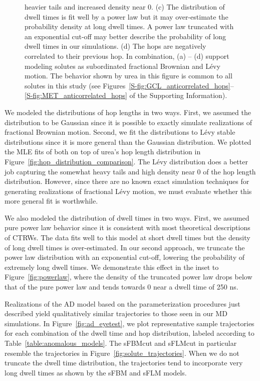 \documentclass[12pt]{article}
\begin{document}
\begin{figure}
{  heavier tails and increased density near 0. (c) The distribution of dwell times is fit
  well by a power law but it may over-estimate the probability density at long dwell times.
  A power law truncated with an exponential cut-off may better describe the probability of
  long dwell times in our simulations. (d) The hops are negatively correlated to their previous
  hop. In combination, (a) -- (d) support modeling solutes as subordinated fractional Brownian
  and L\'evy motion. The behavior shown by urea in this figure is common to all solutes in this study (see
  Figures~\ref{S-fig:GCL_anticorrelated_hops}--\ref{S-fig:MET_anticorrelated_hops} of the
  Supporting Information).}\label{fig:anticorrelated_hops}
  \end{figure}
  
  We modeled the distributions of hop lengths in two ways. First, we assumed the 
  distribution to be Gaussian since it is possible to exactly simulate realizations of
  fractional Brownian motion. Second, we fit the distributions to L\'evy stable 
  distributions since it is more general than the Gaussian distribution. We plotted
  the MLE fits of both on top of urea's hop length distribution in 
  Figure~\ref{fig:hop_distribution_comparison}. The L\'evy distribution does a better
  job capturing the somewhat heavy tails and high density near 0 of the hop length distribution.
  However, since there are no known exact simulation techniques for generating 
  realizations of fractional L\'evy motion, we must evaluate whether this more general
  fit is worthwhile. 
  
  We also modeled the distribution of dwell times in two ways. First, we assumed pure
  power law behavior since it is consistent with most theoretical descriptions of CTRWs.
  The data fits well to this model at short dwell times but the density of long dwell
  times is over-estimated. In our second approach, we truncate the power law distribution
  with an exponential cut-off, lowering the probability of extremely long dwell times. 
  We demonstrate this effect in the inset to Figure~\ref{fig:powerlaw}, where the
  density of the truncated power law drops below that of the pure power law and tends towards
  0 near a dwell time of 250 ns.
  
  Realizations of the AD model based on the parameterization procedures just described
  yield qualitatively similar trajectories to those seen in our MD simulations. In
  Figure~\ref{fig:ad_eyetest}, we plot representative sample trajectories for each
  combination of the dwell time and hop distribution, labeled according to Table~\ref{table:anomalous_models}.
  The sFBMcut and sFLMcut in particular resemble the trajectories in Figure~\ref{fig:solute_trajectories}.
  When we do not truncate the dwell time distribution, the trajectories tend to 
  incorporate very long dwell times as shown by the sFBM and sFLM models.
  
\end{document}
